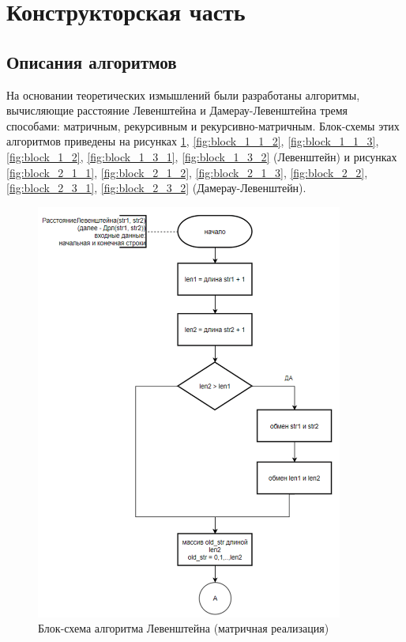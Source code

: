 \section{Конструкторская часть}
\subsection*{Описания алгоритмов}

\hspace{1.25cm}
На основании теоретических измышлений были разработаны алгоритмы, вычисляющие расстояние Левенштейна и Дамерау-Левенштейна тремя способами: матричным, рекурсивным и рекурсивно-матричным. Блок-схемы этих алгоритмов приведены на рисунках \ref{fig:block_1_1_1}, \ref{fig:block_1_1_2}, \ref{fig:block_1_1_3}, \ref{fig:block_1_2}, \ref{fig:block_1_3_1}, \ref{fig:block_1_3_2} (Левенштейн) и рисунках \ref{fig:block_2_1_1}, \ref{fig:block_2_1_2}, \ref{fig:block_2_1_3}, \ref{fig:block_2_2}, \ref{fig:block_2_3_1}, \ref{fig:block_2_3_2} (Дамерау-Левенштейн).

\begin{figure}[H]
    \centering
    \includegraphics[width=0.9\textwidth]{img/block_1_1_1.png}
    \caption{Блок-схема алгоритма Левенштейна (матричная реализация)}
    \label{fig:block_1_1_1}
\end{figure}


